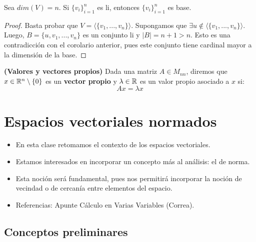 \begin{teorema}
	Sea $dim(V) = n$. Si $\{v_i\}_{i=1}^n$ es li, entonces $\{v_i\}_{i=1}^n$ es base. 
\end{teorema}

\begin{proof}
	Basta probar que $V = \langle \{v_1, ... , v_n\}\rangle$. Supongamos que $\exists u \notin \langle \{v_1, ... , v_n\}\rangle$. Luego, $B = \{ u, v_1, ... , v_n\}$ es un conjunto li y $|B| = n+1 > n$. Esto es una contradicción con el corolario anterior, pues este conjunto tiene cardinal mayor a la dimensión de la base.
\end{proof}


\begin{definicion}
	\textbf{(Valores y vectores propios)}
	Dada una matriz $A \in M_{nn}$, diremos que $x \in \mathbb{R}^n\setminus \{ 0\}$ es un \textbf{vector propio} y $\lambda \in \mathbb{R}$ es un valor propio asociado a $x$ si: 
$$ Ax = \lambda x $$ 
\end{definicion}




\section{Espacios vectoriales normados}

\begin{itemize}
	\item En esta clase retomamos el contexto de los espacios vectoriales. 
	\bigskip 
	\item Estamos interesados en incorporar un concepto más al análisis: el de norma. 
	\bigskip 
	\item Esta noción será fundamental, pues nos permitirá incorporar la noción de vecindad o de cercanía entre elementos del espacio. 
	\bigskip 
	\item Referencias: Apunte Cálculo en Varias Variables (Correa). 
\end{itemize}

\subsection{Conceptos preliminares}

